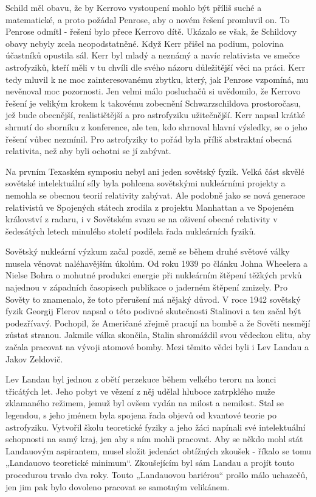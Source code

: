   Schild měl obavu, že by Kerrovo vystoupení mohlo být příliš suché a matematické, a proto požádal
  Penrose, aby o novém řešení promluvil on. To Penrose odmítl - řešení bylo přece Kerrovo dítě.
  Ukázalo se však, že Schildovy obavy nebyly zcela neopodstatněné. Když Kerr přišel na podium,
  polovina účastníků opustila sál. Kerr byl mladý a neznámý a navíc relativista ve smečce
  astrofyziků, kteří měli v tu chvíli dle svého názoru důležitější věci na práci. Kerr tedy mluvil k
  ne moc zainteresovanému zbytku, který, jak Penrose vzpomíná, mu nevěnoval moc pozornosti. Jen
  velmi málo posluchačů si uvědomilo, že Kerrovo řešení je velikým krokem k takovému zobecnění
  Schwarzschildova prostoročasu, jež bude obecnější, realističtější a pro astrofyziku užitečnější.
  Kerr napsal krátké shrnutí do sborníku z konference, ale ten, kdo shrnoval hlavní výsledky, se o
  jeho řešení vůbec nezmínil. Pro astrofyziky to pořád byla příliš abstraktní obecná relativita, než
  aby byli ochotni se jí zabývat. 

  Na prvním Texaském symposiu nebyl ani jeden sovětský fyzik. Velká část skvělé sovětské
  intelektuální síly byla pohlcena sovětskými nukleárními projekty a nemohla se obecnou teorií
  relativity zabývat. Ale podobně jako se nová generace relativistů ve Spojených státech zrodila z
  projektu Manhattan a ve Spojeném království z radaru, i v Sovětském svazu se na oživení obecné
  relativity v šedesátých letech minulého století podílela řada nukleárních fyziků. 

  Sovětský nukleární výzkum začal pozdě, země se během druhé světové války musela věnovat
  naléhavějším úkolům. Od roku 1939 po článku Johna Wheelera a Nielse Bohra o mohutné produkci
  energie při nukleárním štěpení těžkých prvků najednou v západních časopisech publikace o jaderném
  štěpení zmizely. Pro Sověty to znamenalo, že toto přerušení má nějaký důvod. V roce 1942 sovětský
  fyzik Georgij Flerov napsal o této podivné skutečnosti Stalinovi a ten začal být podezřívavý.
  Pochopil, že Američané zřejmě pracují na bombě a že Sověti nesmějí zůstat stranou. Jakmile válka
  skončila, Stalin shromáždil svou vědeckou elitu, aby začala pracovat na vývoji atomové bomby. Mezi
  těmito vědci byli i Lev Landau a Jakov Zeldovič. 

  Lev Landau byl jednou z obětí perzekuce během velkého teroru na konci třicátých let. Jeho pobyt ve
  vězení z něj udělal hluboce zatrpklého muže zklamaného režimem, jemuž byl ovšem vydán na milost a
  nemilost. Stal se legendou, s jeho jménem byla spojena řada objevů od kvantové teorie po
  astrofyziku. Vytvořil školu teoretické fyziky a jeho žáci napínali své intelektuální schopnosti na
  samý kraj, jen aby s ním mohli pracovat. Aby se někdo mohl stát Landauovým aspirantem, musel
  složit jedenáct obtížných zkoušek - říkalo se tomu „Landauovo teoretické minimum“. Zkoušejícím byl
  sám Landau a projít touto procedurou trvalo dva roky. Touto „Landauovou bariérou“ prošlo málo
  uchazečů, jen jim pak bylo dovoleno pracovat se samotným velikánem. 

